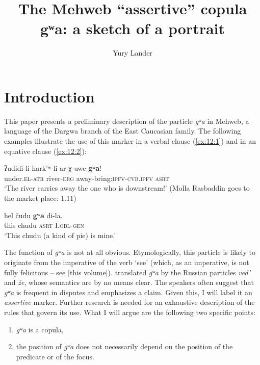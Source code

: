 ﻿\documentclass[output=paper]{langsci/langscibook}
\title{The Mehweb ``assertive'' copula {gʷa}: a sketch of a portrait}
\author{Yury Lander\affiliation{National Research University Higher School of Economics}}
\begin{document}
\maketitle

\section{Introduction}

This paper presents a preliminary description of the particle \emph{gʷa}
in Mehweb, a language of the Dargwa branch of the East Caucasian family.
The following examples illustrate the use of this marker in a verbal
clause (\ref{ex:12:1}) and in an equative clause (\ref{ex:12:2}):

\ea \label{ex:12:1} %
\gll ʔudidi-li ħark'ʷ-li ar-χ-uwe \textbf{gʷa}!\\
under.\textsc{el}-\textsc{atr} river-\textsc{erg} away-bring:\textsc{ipfv}-\textsc{cvb.ipfv} \textsc{asrt}\\
\glt `The river carries away the one who is downstream!' (Molla Rasbaddin
goes to the market place: 1.11)

\pagebreak[3]

\ex \label{ex:12:2} %
\gll hel čudu \textbf{gʷa} di-la.\\
this chudu \textsc{asrt} I.\textsc{obl}-\textsc{gen}\\
\glt `This chudu (a kind of pie) is mine.'
\z

The function of \emph{gʷa} is not at all obvious. Etymologically, this
particle is likely to originate from the imperative of the verb `see'
(which, as an imperative, is not fully felicitous – see \citealt{dobrushina2019}
[this volume]). \citet[128]{magometov1982} translated \emph{gʷa} by the Russian
particles \emph{ved'} and \emph{že}, whose semantics are by no means
clear. The speakers often suggest that \emph{gʷa} is frequent in
disputes and emphasizes a claim. Given this, I will label it an
\emph{assertive} marker. Further research is needed for an exhaustive
description of the rules that govern its use. What I will argue are the
following two specific points:
\begin{enumerate}[topsep=\medskipamount,itemsep=0pt,partopsep=0pt,parsep=0pt,label={(\roman*})]
\item %
  \emph{gʷa} is a copula,

\item %
  the position of \emph{gʷa} does not necessarily depend on the
position of the predicate or of the focus.
\end{enumerate}
\end{document}
